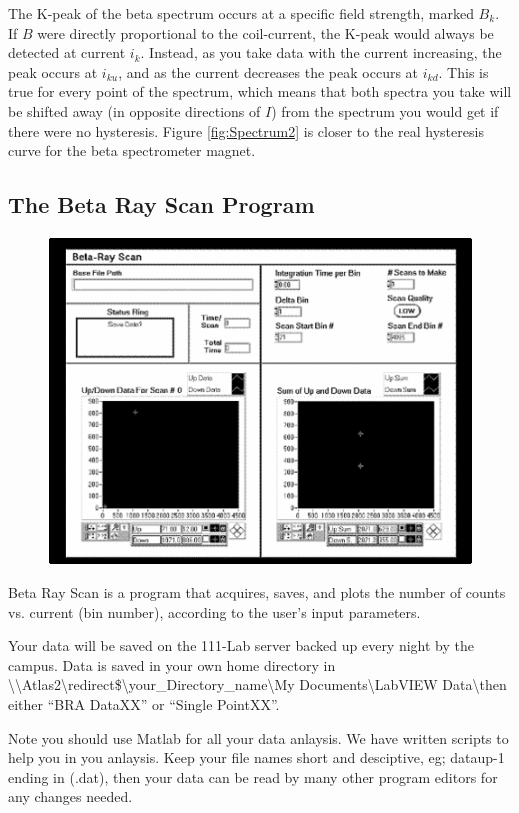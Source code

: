 \documentclass{../lab}
\begin{document}
The K-peak of the beta spectrum occurs at a specific field strength, marked $B_k$. If $B$ were directly proportional to the coil-current, the K-peak would always be detected at current $i_k$. Instead, as you take data with the current increasing, the peak occurs at $i_{ku}$, and as the current decreases the peak occurs at $i_{kd}$. This is true for every point of the spectrum, which means that both spectra you take will be shifted away (in opposite directions of $I$) from the spectrum you would get if there were no hysteresis. Figure \ref{fig:Spectrum2} is closer to the real hysteresis curve for the beta spectrometer magnet.

\pagebreak

\subsection{The Beta Ray Scan Program}

\begin{figure}[h]
    \centering
    \href{http://experimentationlab.berkeley.edu/sites/default/files/images/470px-BRAimage030.gif}{\includegraphics[width=0.5\linewidth]{images/470px-BRAimage030.png}}
    \caption{}
\end{figure}

Beta Ray Scan is a program that acquires, saves, and plots the number of counts vs. current (bin number), according to the user's input parameters.

Your data will be saved on the 111-Lab server backed up every night by the campus. Data is saved in your own home directory in \textbackslash \textbackslash Atlas2\textbackslash redirect\$\textbackslash your\_Directory\_name\textbackslash My Documents\textbackslash LabVIEW Data\textbackslash then either ``BRA DataXX'' or ``Single PointXX''.

Note you should use Matlab for all your data anlaysis. We have written scripts to help you in you anlaysis. Keep your file names short and desciptive, eg; dataup-1 ending in (.dat), then your data can be read by many other program editors for any changes needed.
\end{document}
